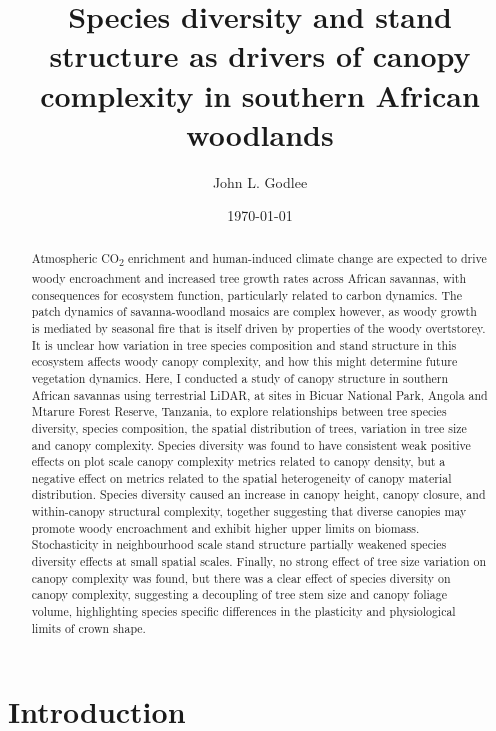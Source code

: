 \documentclass[11pt,a4paper]{article}
\title{Species diversity and stand structure as drivers of canopy complexity in southern African woodlands}
\author{John L. Godlee}
\date{\today}
\begin{document}
\maketitle{}

\linenumbers

\begin{abstract}
	Atmospheric CO\textsubscript{2} enrichment and human-induced climate change are expected to drive woody encroachment and increased tree growth rates across African savannas, with consequences for ecosystem function, particularly related to carbon dynamics. The patch dynamics of savanna-woodland mosaics are complex however, as woody growth is mediated by seasonal fire that is itself driven by properties of the woody overtstorey. It is unclear how variation in tree species composition and stand structure in this ecosystem affects woody canopy complexity, and how this might determine future vegetation dynamics. Here, I conducted a study of canopy structure in southern African savannas using terrestrial LiDAR, at sites in Bicuar National Park, Angola and Mtarure Forest Reserve, Tanzania, to explore relationships between tree species diversity, species composition, the spatial distribution of trees, variation in tree size and canopy complexity. Species diversity was found to have consistent weak positive effects on plot scale canopy complexity metrics related to canopy density, but a negative effect on metrics related to the spatial heterogeneity of canopy material distribution. Species diversity caused an increase in canopy height, canopy closure, and within-canopy structural complexity, together suggesting that diverse canopies may promote woody encroachment and exhibit higher upper limits on biomass. Stochasticity in neighbourhood scale stand structure partially weakened species diversity effects at small spatial scales. Finally, no strong effect of tree size variation on canopy complexity was found, but there was a clear effect of species diversity on canopy complexity, suggesting a decoupling of tree stem size and canopy foliage volume, highlighting species specific differences in the plasticity and physiological limits of crown shape.
\end{abstract}

\section{Introduction}
\end{document}
